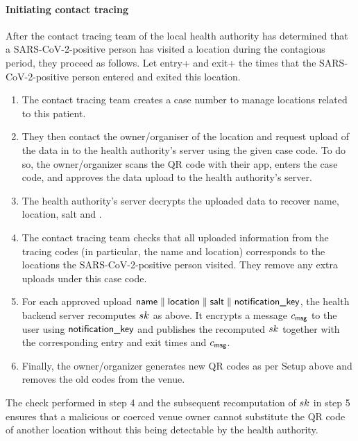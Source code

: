 \paragraph{Initiating contact tracing}
After the contact tracing team of the local health authority has determined that a SARS-CoV-2-positive person has visited a location during the contagious period, they proceed as follows. Let entry+ and exit+ the times that the SARS-CoV-2-positive person entered and exited this location.
\begin{enumerate}
\item The contact tracing team creates a case number to manage locations related to this patient.
\item They then contact the owner/organiser of the location and request upload of the data in \qrtrace to the health authority’s server using the given case code. To do so, the owner/organizer scans the QR code with their app, enters the case code, and approves the data upload to the health authority’s server.
\item The health authority’s server decrypts the uploaded data to recover name, location, salt and \notificationkey.
\item The contact tracing team checks that all uploaded information from the tracing codes (in particular, the name and location) corresponds to the locations the SARS-CoV-2-positive person visited. They remove any extra uploads under this case code.
\item For each approved upload $\textsf{name} \parallel \textsf{location} \parallel \textsf{salt} \parallel \textsf{notification\_key}$, the health backend server recomputes $sk$ as above. It encrypts a message $c_{\textsf{msg}}$ to the user using $\textsf{notification\_key}$ and publishes the recomputed $sk$ together with the corresponding entry and exit times and $c_{\textsf{msg}}$.
\item Finally, the owner/organizer generates new QR codes as per Setup above and removes the old codes from the venue.
\end{enumerate}

The check performed in step 4 and the subsequent recomputation of $sk$ in step 5 ensures that a malicious or coerced venue owner cannot substitute the QR code of another location without this being detectable by the health authority.

